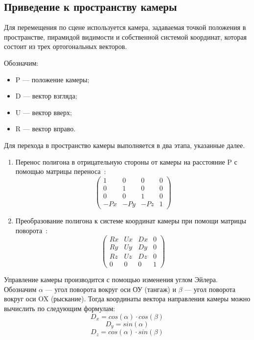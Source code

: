 \subsection{Приведение к пространству камеры}

Для перемещения по сцене используется камера, задаваемая точкой положения в пространстве, пирамидой видимости и собственной системой координат, которая состоит из трех ортогональных векторов.

Обозначим:
\begin{itemize}
	\item P --- положение камеры;
	\item D --- вектор взгляда;
	\item U --- вектор вверх;
	\item R --- вектор вправо.
\end{itemize}

Для перехода в пространство камеры выполняется в два этапа, указанные далее.
\begin{enumerate}
	\item Перенос полигона в отрицательную стороны от камеры на расстояние P с помощью матрицы переноса~\cite{palcing-camera}:
	\begin{equation}
		\begin{pmatrix}
			1  & 0  & 0  & 0 \\
			0  & 1  & 0  & 0 \\
			0  & 0  & 1  & 0 \\
			-Px & -Py & -Pz & 1
		\end{pmatrix}
	\end{equation}
	\item Преобразование полигона к системе координат камеры при помощи матрицы поворота~\cite{palcing-camera}:
	\begin{equation}
		\begin{pmatrix}
			Rx  & Ux  & Dx  & 0 \\
			Ry  & Uy  & Dy  & 0 \\
			Rz  & Uz  & Dz  & 0 \\
			0   & 0   & 0   & 1
		\end{pmatrix}
	\end{equation}
\end{enumerate}

Управление камеры производится с помощью изменения углом Эйлера.
Обозначим $\alpha$ --- угол поворота вокруг оси ОУ (тангаж) и  $\beta$ --- угол поворота вокруг оси OX (рыскание).
Тогда координаты вектора направления камеры можно вычислить по следующим формулам:
\begin{equation}
	D_x = cos(\alpha) \cdot cos(\beta)
\end{equation}
\begin{equation}
	D_y = sin(\alpha)
\end{equation}
\begin{equation}
	D_z = cos(\alpha) \cdot sin(\beta)
\end{equation}


